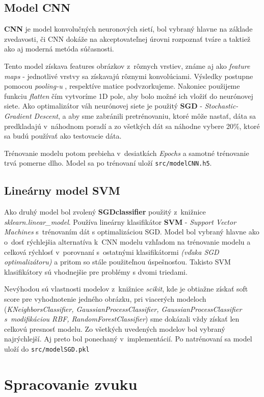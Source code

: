 \documentclass[11pt, a4paper]{article}
\begin{document}
\subsection{Model CNN}
\textbf{CNN} je model konvolučných neuronových sietí, bol vybraný hlavne na základe zvedavosti, či CNN dokáže na akceptovateľnej úrovni rozpoznať tváre a taktiež ako aj moderná metóda súčasnosti.

Tento model získava features obrázkov z~rôznych vrstiev, známe aj ako \emph{feature maps} - jednotlivé vrstvy sa získavajú rôznymi konvolúciami. Výsledky postupne pomocou \emph{pooling-u} , respektíve matice podvzorkujeme. Nakoniec použijeme funkciu \emph{flatten} čím vytvoríme 1D pole, aby bolo možné ich vložiť do neurónovej siete. Ako optimalizátor váh neurónovej siete je použitý \textbf{SGD} - \emph{Stochastic-Gradient Descent}, a aby sme zabránili pretrénovaniu, ktoré môže nastať, dáta sa predkladajú v~náhodnom poradí a zo všetkých dát sa náhodne vybere 20\%, ktoré sa budú používať ako testovacie dáta. 

Trénovanie modelu potom prebieha v~desiatkách \emph{Epochs} a samotné trénovanie  trvá pomerne dlho. Model sa po trénovaní uloží \texttt{src/modelCNN.h5}.

\subsection{Lineárny model SVM}
Ako druhý model bol zvolený \textbf{SGDclassifier} použitý z~knižnice \emph{sklearn.linear\_model}. Používa lineárny klasifikátor \textbf{SVM} - \emph{Support Vector Machines} s~trénovaním dát s optimalizáciou SGD. Model bol vybraný hlavne ako o~dosť rýchlejšia alternatíva k~CNN modelu vzhľadom na trénovanie modelu a celková rýchlosť v~porovnaní s~ostatnými klasifikátormi \emph{(vďaka SGD optimalizátoru)} a pritom so stále použiteľnou úspešnosťou. Takisto SVM klasifikátory sú vhodnejšie pre problémy s dvomi triedami.

Nevýhodou sú vlastnosti modelov z~knižnice \emph{scikit}, kde je obtiažne získať soft score pre vyhodnotenie jedného obrázku, pri viacerých modeloch (\emph{KNeighborsClassifier, GaussianProcessClassifier, GaussianProcessClassifier s~modifikáciou RBF, RandomForestClassifier}) sme dokázali vždy získať len celkovú presnosť modelu. Zo všetkých uvedených modelov bol vybraný najrýchlejší. Aj preto bol ponechaný v~implementácií. Po natrénovaní sa model uloží do \texttt{src/modelSGD.pkl}
	\section{Spracovanie zvuku}
\end{document}
